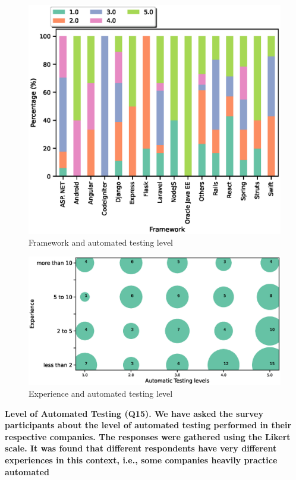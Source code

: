 \begin{figure}[h]
\centering
  \includegraphics[scale=0.65]{Figures/Framework_and_Test_Level}
  \caption{Framework and automated testing level}
  \label{fig:framework and autotest}
\end{figure}
\begin{figure}[h]
\centering
  \includegraphics[scale=0.45]{Figures/Auto_Test_and_Experience}
  \caption{Experience and automated testing level}
  \label{fig:experience and autotest}
\end{figure}
\bf{Level of Automated Testing (Q15).}
We have asked the survey participants about the level of automated testing
performed in their respective companies. The responses were gathered using the
Likert scale. It was found that different respondents have very different
experiences in this context, i.e., some companies heavily practice automated
